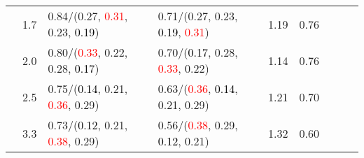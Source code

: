 \documentclass[10pt,a4paper]{report}
\begin{document}
\begin{table}[!htbp]
\begin{center}
{\begin{tabular}{ccllccccc}
				  & 1.7                               & 0.84/(0.27, \textcolor{red}{0.31}, 0.23, \textcolor{black}{0.19})                                 & 0.71/(0.27, 0.23, \textcolor{black}{0.19}, \textcolor{red}{0.31})                                 & 1.19             & 0.76                     \\
				  & 2.0                               & 0.80/(\textcolor{red}{0.33}, 0.22, 0.28, \textcolor{black}{0.17})                                 & 0.70/(\textcolor{black}{0.17}, 0.28, \textcolor{red}{0.33}, 0.22)                                 & 1.14             & 0.76                     \\
				  & 2.5                               & 0.75/(\textcolor{black}{0.14}, 0.21, \textcolor{red}{0.36}, 0.29)                                 & 0.63/(\textcolor{red}{0.36}, \textcolor{black}{0.14}, 0.21, 0.29)                                 & 1.21             & 0.70                     \\
				  & 3.3                               & 0.73/(\textcolor{black}{0.12}, 0.21, \textcolor{red}{0.38}, 0.29)                                 & 0.56/(\textcolor{red}{0.38}, 0.29, \textcolor{black}{0.12}, 0.21)                                 & 1.32             & 0.60                     \\
				\bottomrule
			\end{tabular}}
	\end{center}
\end{table}
\end{document}
